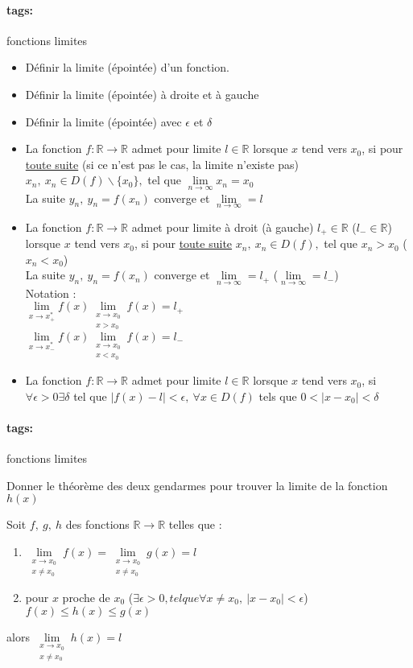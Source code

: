 \documentclass[12pt]{article}
\newcommand*{\xfield}[1]{\begin{mdframed}\centering #1\end{mdframed}\bigskip}
\newenvironment{note}{}{}
\newcommand*{\tags}[1]{\paragraph{tags: }#1}
\begin{document}
\begin{note}
	\tags{fonctions limites}
	\xfield{\begin{itemize}
	\item Définir la limite (épointée) d'un fonction.
	\item Définir la limite (épointée) à droite et à gauche
	\item Définir la limite (épointée) avec $\epsilon$ et $\delta$
	\end{itemize} }
	\xfield{\begin{itemize}
	\item La fonction $f : \mathbb{R} \rightarrow \mathbb{R}$ admet pour limite $l \in \mathbb{R}$ lorsque $x$ tend vers $x_0$, si pour \underline{toute suite} (si ce n'est pas le cas, la limite n'existe pas) $x_n,\ x_n \in D(f) \smallsetminus \{x_0\},$ tel que $\lim\limits_{n \to \infty}x_n = x_0$ \\
	La suite $y_n,\ y_n = f(x_n)$ converge et $\lim\limits_{n \to \infty} = l$
	\item La fonction $f : \mathbb{R} \rightarrow \mathbb{R}$ admet pour limite à droit (à gauche) $l_+ \in \mathbb{R}$ ($l_- \in \mathbb{R}$) lorsque $x$ tend vers $x_0$, si pour \underline{toute suite} $x_n,\ x_n \in D(f),$ tel que $x_n > x_0$ ($x_n < x_0$) \\
	La suite $y_n,\ y_n = f(x_n)$ converge et $\lim\limits_{n \to \infty} = l_+$ ($\lim\limits_{n \to \infty} = l_-$)\\
	Notation :\\
	$\lim\limits_{x \to x_+^*}f(x)\lim\limits_{\substack{x \to x_0 \\ x > x_0}}f(x) = l_+$\\
	$\lim\limits_{x \to x_-^*}f(x)\lim\limits_{\substack{x \to x_0 \\ x < x_0}}f(x) = l_-$
	\item La fonction $f : \mathbb{R} \rightarrow \mathbb{R}$ admet pour limite $l \in \mathbb{R}$ lorsque $x$ tend vers $x_0$, si $\forall \epsilon > 0 \exists \delta$ tel que $|f(x) -l| < \epsilon,\ \forall x \in D(f)$ tels que $0< |x-x_0| < \delta$
	\end{itemize} }
\end{note}

\begin{note}
	\tags{fonctions limites}
	\xfield{Donner le théorème des deux gendarmes pour trouver la limite de la fonction $h(x)$}
	\xfield{Soit $f,\ g,\ h$ des fonctions $\mathbb{R} \to \mathbb{R}$ telles que :
	\begin{enumerate}
		\item $\lim\limits_{\substack{x\to x_0\\x \neq x_0}}f(x) = \lim\limits_{\substack{x\to x_0\\x \neq x_0}}g(x) = l$
		\item pour $x$ proche de $x_0$ ($\exists \epsilon > 0, tel que \forall x \neq x_0,\ |x-x_0| < \epsilon$)\\
		$f(x) \le h(x) \le g(x)$
	\end{enumerate}
	alors  $\lim\limits_{\substack{x\to x_0\\x \neq x_0}}h(x) = l$}
\end{note}
\end{document}
